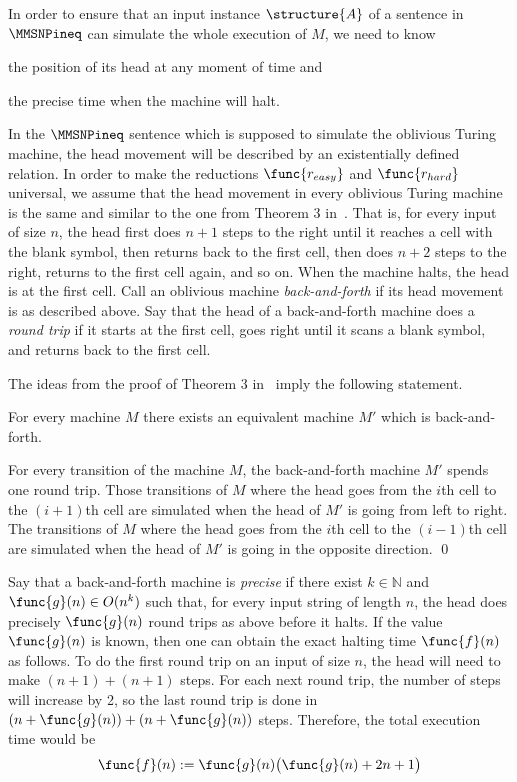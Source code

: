 \documentclass{lmcs}
\begin{document}
In order to ensure that an input instance $\structure{A}$ of a sentence in $\MMSNPineq$ can simulate the whole execution of $M$, we need to know
\begin{inparaenum}[(a)] \item the position of its head at any moment of time and \item the precise time when the machine will halt.
\end{inparaenum}

In the $\MMSNPineq$ sentence which is supposed to simulate the oblivious Turing machine, the head movement will be described by an existentially defined relation.
In order to make the reductions $\func{r_{easy}}$ and $\func{r_{hard}}$ universal, we assume that the head movement in every oblivious Turing machine is the same and similar to the one from Theorem 3 in~\cite{pippenger1979}.
That is, for every input of size $n$, the head first does $n+1$ steps to the right until it reaches a cell with the blank symbol, then returns back to the first cell, then does $n+2$ steps to the right, returns to the first cell again, and so on. 
When the machine halts, the head is at the first cell. 
Call an oblivious machine \emph{back-and-forth} if its head movement is as described above. 
Say that the head of a back-and-forth machine does a \emph{round trip} if it starts at the first cell, goes right until it scans a blank symbol, and returns back to the first cell. 

The ideas from the proof of Theorem 3 in~\cite{pippenger1979} imply the following statement.

\begin{lem}\label{lem:pippenger}
For every machine $M$ there exists an equivalent machine $M'$ which is back-and-forth.
\end{lem}
\proof
For every transition of the machine $M$, the back-and-forth machine $M'$ spends one round trip. Those transitions of $M$ where the head goes from the $i$th cell to the $(i+1)$th cell are simulated when the head of $M'$ is going from left to right. The transitions of $M$ where the head goes from the $i$th cell to the $(i-1)$th cell are simulated when the head of $M'$ is going in the opposite direction.
\qed

\medskip

Say that a back-and-forth machine is \emph{precise} if there exist $k\in\mathbb{N}$ and $\func{g}(n)\in O(n^k)$ such that, for every input string of length $n$, the head does precisely $\func{g}(n)$ round trips as above before it halts. 
If the value $\func{g}(n)$ is known, then one can obtain the exact halting time $\func{f}(n)$ as follows.
To do the first round trip on an input of size $n$, the head will need to make $(n+1)+(n+1)$ steps.
For each next round trip, the number of steps will increase by 2, so the last round trip is done in $(n+\func{g}(n))+(n+\func{g}(n))$ steps.
Therefore, the total execution time would be
\begin{equation*}
\func{f}(n) := \func{g}(n)\bigl(\func{g}(n)+2n+1\bigr)
\end{equation*}
\end{document}
